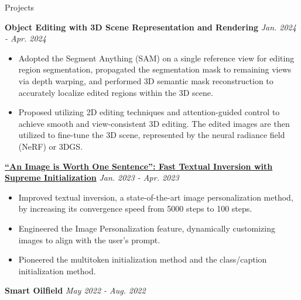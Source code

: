 \documentclass{resume} %
\begin{document}
\begin{rSection}{Projects}

{\bf Object Editing with 3D Scene Representation and Rendering} \hfill {\em Jan. 2024 - Apr. 2024} 
\begin{itemize}
    \vspace{-0.2cm}\item Adopted the Segment Anything (SAM) on a single reference view for editing region segmentation, propagated the segmentation mask to remaining views via depth warping, and performed 3D semantic mask reconstruction to accurately localize edited regions within the 3D scene.
    \vspace{-0.2cm}\item Proposed utilizing 2D editing techniques and attention-guided control to achieve smooth and view-consistent 3D editing. The edited images are then utilized to fine-tune the 3D scene, represented by the neural radiance field (NeRF) or 3DGS.

\end{itemize}

\href{https://github.com/jenci2114/csc413-project}{\bf “An Image is Worth One Sentence”: Fast Textual Inversion with Supreme Initialization} \hfill {\em Jan. 2023 - Apr. 2023} 
\begin{itemize}
    \vspace{-0.2cm}\item Improved textual inversion, a state-of-the-art image personalization method, by increasing its convergence speed from 5000 steps to 100 steps.
    \vspace{-0.2cm}\item Engineered the Image Personalization feature, dynamically customizing images to align with the user's prompt.
    \vspace{-0.2cm}\item Pioneered the multitoken initialization method and the class/caption initialization method.
\end{itemize}

{\bf Smart Oilfield } \hfill {\em May 2022 - Aug. 2022} 


\end{rSection}
\end{document}
